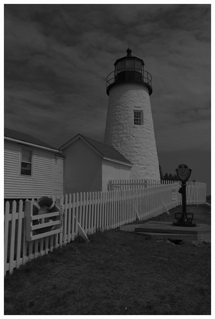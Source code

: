 \documentclass[a4paper,12pt]{report}
\begin{document}
\begin{figure}[!ht]
	\includegraphics[scale=0.3]{./image/part2-23Vert.png}

\end{figure}
\end{document}
